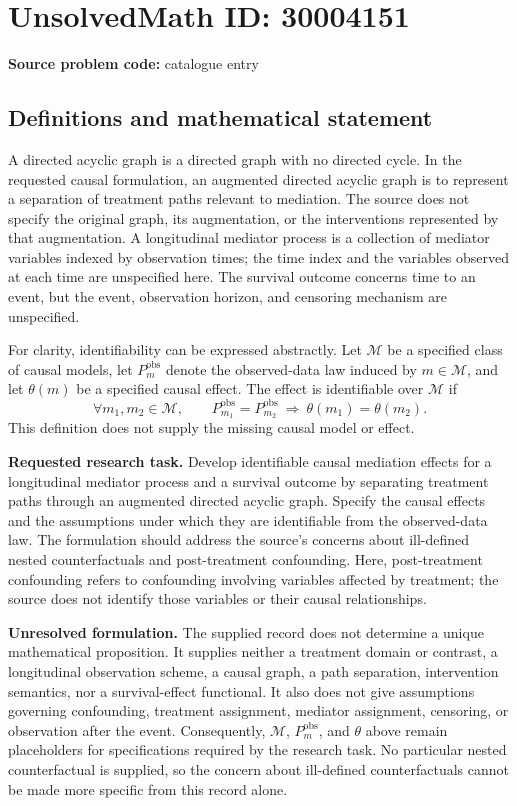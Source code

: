 \documentclass[11pt]{article}
\begin{document}
\section*{UnsolvedMath ID: 30004151}
\textbf{Source problem code:} catalogue entry
\subsection{Definitions and mathematical statement}
A directed acyclic graph is a directed graph with no directed cycle. In the requested causal formulation, an augmented directed acyclic graph is to represent a separation of treatment paths relevant to mediation. The source does not specify the original graph, its augmentation, or the interventions represented by that augmentation. A longitudinal mediator process is a collection of mediator variables indexed by observation times; the time index and the variables observed at each time are unspecified here. The survival outcome concerns time to an event, but the event, observation horizon, and censoring mechanism are unspecified.

For clarity, identifiability can be expressed abstractly. Let \(\mathcal M\) be a specified class of causal models, let \(P_m^{\mathrm{obs}}\) denote the observed-data law induced by \(m\in\mathcal M\), and let \(\theta(m)\) be a specified causal effect. The effect is identifiable over \(\mathcal M\) if
\[
\forall m_1,m_2\in\mathcal M,\qquad
P_{m_1}^{\mathrm{obs}}=P_{m_2}^{\mathrm{obs}}
\ \Longrightarrow\ 
\theta(m_1)=\theta(m_2).
\]
This definition does not supply the missing causal model or effect.

\textbf{Requested research task.} Develop identifiable causal mediation effects for a longitudinal mediator process and a survival outcome by separating treatment paths through an augmented directed acyclic graph. Specify the causal effects and the assumptions under which they are identifiable from the observed-data law. The formulation should address the source's concerns about ill-defined nested counterfactuals and post-treatment confounding. Here, post-treatment confounding refers to confounding involving variables affected by treatment; the source does not identify those variables or their causal relationships.

\textbf{Unresolved formulation.} The supplied record does not determine a unique mathematical proposition. It supplies neither a treatment domain or contrast, a longitudinal observation scheme, a causal graph, a path separation, intervention semantics, nor a survival-effect functional. It also does not give assumptions governing confounding, treatment assignment, mediator assignment, censoring, or observation after the event. Consequently, \(\mathcal M\), \(P_m^{\mathrm{obs}}\), and \(\theta\) above remain placeholders for specifications required by the research task. No particular nested counterfactual is supplied, so the concern about ill-defined counterfactuals cannot be made more specific from this record alone.
\end{document}
